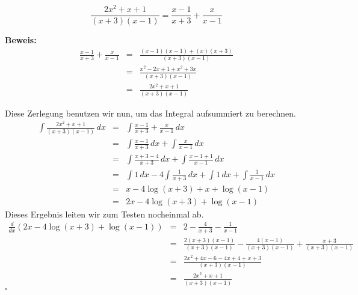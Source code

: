 \documentclass[11pt,a4paper,ngerman]{article}
\begin{document}
\begin{enumerate}[a.]
\begin{description}
                $$
                    \frac{2x^2 + x + 1}{(x+3)(x-1)} = \frac{x-1}{x+3} + \frac{x}{x-1}
                $$
            \item{\bfseries\rmfamily Beweis:}
                $$\begin{array}{rcl}
                    \frac{x-1}{x+3} + \frac{x}{x-1}
                        &=& \frac{(x-1)(x-1) + (x)(x+3)}{(x+3)(x-1)}\\
                        &=& \frac{x^2 - 2x + 1 + x^2 + 3x}{(x+3)(x-1)}\\
                        &=& \frac{2x^2  + x + 1}{(x+3)(x-1)}
                \end{array}$$
        \end{description}
        Diese Zerlegung benutzen wir nun, um das Integral aufsummiert zu berechnen.\\
        $$\begin{array}{rcl}
            \int \frac{2x^2 + x + 1}{(x+3)(x-1)} \, dx &=& \int \frac{x-1}{x+3} + \frac{x}{x-1} \, dx\\
                &=& \int \frac{x-1}{x+3} \, dx + \int \frac{x}{x-1} \, dx \\
                &=& \int \frac{x+3-4}{x+3} \, dx + \int \frac{x-1+1}{x-1} \, dx\\
                &=& \int 1 \, dx - 4\int \frac{1}{x+3} \, dx + \int 1 \, dx + \int \frac{1}{x-1} \, dx\\
                &=& x - 4 \log (x+3) + x + \log(x-1)\\
                &=& 2x - 4\log(x+3) + \log(x-1)
        \end{array}$$
        Dieses Ergebnis leiten wir zum Testen nocheinmal ab.\\
        $$\begin{array}{rcl}
            \frac{d}{dx} \left( 2x - 4\log(x+3) + \log(x-1) \right)
                &=& 2 - \frac{4}{x+3} - \frac{1}{x-1}\\
                &=& \frac{2(x+3)(x-1)}{(x+3)(x-1)} - \frac{4(x-1)}{(x+3)(x-1)} + \frac{x+3}{(x+3)(x-1)}\\
                &=& \frac{2x^2 + 4 x - 6 - 4x + 4 + x  + 3}{(x+3)(x-1)}\\
                &=& \frac{2x^2 + x + 1}{(x+3)(x-1)}
        \end{array}$$
        \mbox{}\hfill $\square$

\end{enumerate}

\end{document}
